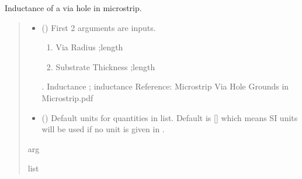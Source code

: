 \documentclass[letterpaper,10pt,english]{sphinxmanual}
\begin{document}

\begin{fulllineitems}
\label{\detokenize{components:components.L_microstrip_via_hole}}
\pysigstartsignatures
{}
\pysigstopsignatures
\sphinxAtStartPar
Inductance of a via hole in microstrip.
\begin{quote}\begin{description}
\begin{itemize}
\item {} 
\sphinxAtStartPar
{} () \textendash{} 
\sphinxAtStartPar
First 2 arguments are inputs.
\begin{enumerate}
%
\item {} 
\sphinxAtStartPar
Via Radius ;length

\item {} 
\sphinxAtStartPar
Substrate Thickness ;length

\end{enumerate}

. Inductance ; inductance
Reference:  Microstrip Via Hole Grounds in Microstrip.pdf


\item {} 
\sphinxAtStartPar
{} (\sphinxstyleliteralemphasis{\sphinxupquote{, }}) \textendash{} Default units for quantities in  list. Default is {[}{]} which means SI units will be used if no unit is given in .

\end{itemize}

\sphinxAtStartPar
arg

\sphinxAtStartPar
list

\end{description}\end{quote}

\end{fulllineitems}
\end{document}
